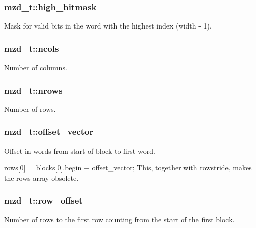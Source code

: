\subsubsection[{high\+\_\+bitmask}]{ mzd\+\_\+t\+::high\+\_\+bitmask}\label{structmzd__t_ae4810dc31efe46823859366b6027d6b2}
Mask for valid bits in the word with the highest index (width -\/ 1). \hypertarget{structmzd__t_aff453b90ed1f50baf4454e70c3f1d19e}{}
\subsubsection[{ncols}]{ mzd\+\_\+t\+::ncols}\label{structmzd__t_aff453b90ed1f50baf4454e70c3f1d19e}
Number of columns. \hypertarget{structmzd__t_a23d9c4b4c77bddce183fde327256f3ff}{}
\subsubsection[{nrows}]{ mzd\+\_\+t\+::nrows}\label{structmzd__t_a23d9c4b4c77bddce183fde327256f3ff}
Number of rows. \hypertarget{structmzd__t_ad4d16d8c1fc19e3b872fa7c87acd7554}{}
\subsubsection[{offset\+\_\+vector}]{ mzd\+\_\+t\+::offset\+\_\+vector}\label{structmzd__t_ad4d16d8c1fc19e3b872fa7c87acd7554}


Offset in words from start of block to first word. 

rows\mbox{[}0\mbox{]} = blocks\mbox{[}0\mbox{]}.begin + offset\+\_\+vector; This, together with rowstride, makes the rows array obsolete. \hypertarget{structmzd__t_a1d95aca572cb27799972ceb308ea219f}{}
\subsubsection[{row\+\_\+offset}]{ mzd\+\_\+t\+::row\+\_\+offset}\label{structmzd__t_a1d95aca572cb27799972ceb308ea219f}
Number of rows to the first row counting from the start of the first block. \hypertarget{structmzd__t_ae809b9c25df0752caabe8233209dd447}{}
